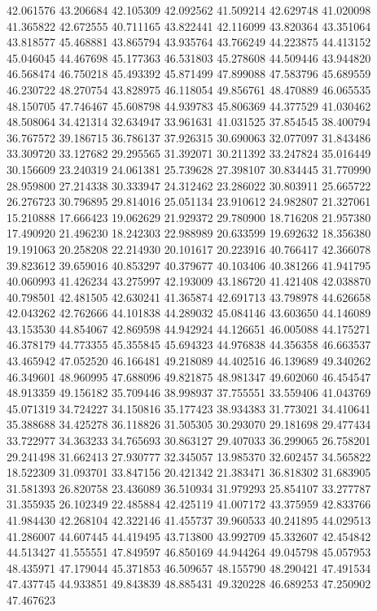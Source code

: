 42.061576
43.206684
42.105309
42.092562
41.509214
42.629748
41.020098
41.365822
42.672555
40.711165
43.822441
42.116099
43.820364
43.351064
43.818577
45.468881
43.865794
43.935764
43.766249
44.223875
44.413152
45.046045
44.467698
45.177363
46.531803
45.278608
44.509446
43.944820
46.568474
46.750218
45.493392
45.871499
47.899088
47.583796
45.689559
46.230722
48.270754
43.828975
46.118054
49.856761
48.470889
46.065535
48.150705
47.746467
45.608798
44.939783
45.806369
44.377529
41.030462
48.508064
34.421314
32.634947
33.961631
41.031525
37.854545
38.400794
36.767572
39.186715
36.786137
37.926315
30.690063
32.077097
31.843486
33.309720
33.127682
29.295565
31.392071
30.211392
33.247824
35.016449
30.156609
23.240319
24.061381
25.739628
27.398107
30.834445
31.770990
28.959800
27.214338
30.333947
24.312462
23.286022
30.803911
25.665722
26.276723
30.796895
29.814016
25.051134
23.910612
24.982807
21.327061
15.210888
17.666423
19.062629
21.929372
29.780900
18.716208
21.957380
17.490920
21.496230
18.242303
22.988989
20.633599
19.692632
18.356380
19.191063
20.258208
22.214930
20.101617
20.223916
40.766417
42.366078
39.823612
39.659016
40.853297
40.379677
40.103406
40.381266
41.941795
40.060993
41.426234
43.275997
42.193009
43.186720
41.421408
42.038870
40.798501
42.481505
42.630241
41.365874
42.691713
43.798978
44.626658
42.043262
42.762666
44.101838
44.289032
45.084146
43.603650
44.146089
43.153530
44.854067
42.869598
44.942924
44.126651
46.005088
44.175271
46.378179
44.773355
45.355845
45.694323
44.976838
44.356358
46.663537
43.465942
47.052520
46.166481
49.218089
44.402516
46.139689
49.340262
46.349601
48.960995
47.688096
49.821875
48.981347
49.602060
46.454547
48.913359
49.156182
35.709446
38.998937
37.755551
33.559406
41.043769
45.071319
34.724227
34.150816
35.177423
38.934383
31.773021
34.410641
35.388688
34.425278
36.118826
31.505305
30.293070
29.181698
29.477434
33.722977
34.363233
34.765693
30.863127
29.407033
36.299065
26.758201
29.241498
31.662413
27.930777
32.345057
13.985370
32.602457
34.565822
18.522309
31.093701
33.847156
20.421342
21.383471
36.818302
31.683905
31.581393
26.820758
23.436089
36.510934
31.979293
25.854107
33.277787
31.355935
26.102349
22.485884
42.425119
41.007172
43.375959
42.833766
41.984430
42.268104
42.322146
41.455737
39.960533
40.241895
44.029513
41.286007
44.607445
44.419495
43.713800
43.992709
45.332607
42.454842
44.513427
41.555551
47.849597
46.850169
44.944264
49.045798
45.057953
48.435971
47.179044
45.371853
46.509657
48.155790
48.290421
47.491534
47.437745
44.933851
49.843839
48.885431
49.320228
46.689253
47.250902
47.467623
